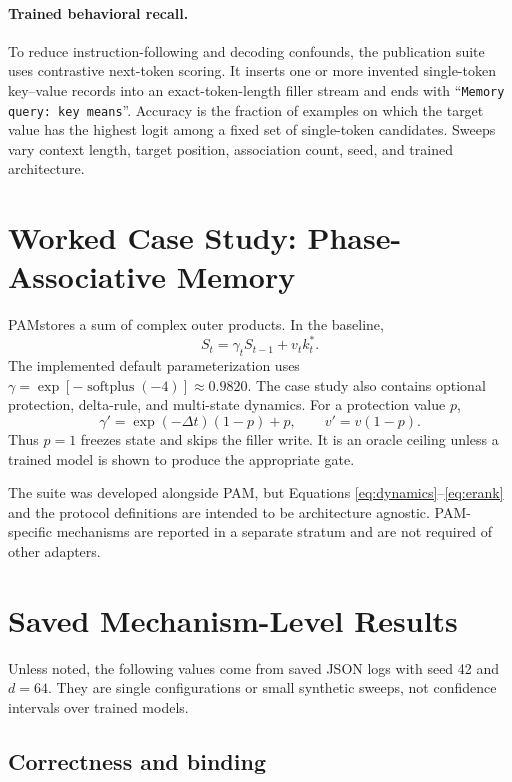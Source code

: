 \documentclass[10pt,twocolumn]{article}
\newcommand{\pam}{\textsc{PAM}}
\begin{document}
\paragraph{Trained behavioral recall.}
To reduce instruction-following and decoding confounds, the publication suite
uses contrastive next-token scoring.  It inserts one or more invented
single-token key--value records into an exact-token-length filler stream and
ends with ``\texttt{Memory query: key means}''.  Accuracy is the fraction of
examples on which the target value has the highest logit among a fixed set of
single-token candidates.  Sweeps vary context length, target position,
association count, seed, and trained architecture.

\section{Worked Case Study: Phase-Associative Memory}
\label{sec:pam}

\pam stores a sum of complex outer products.  In the baseline,
\begin{equation}
  S_t=\gamma_t S_{t-1}+v_tk_t^{*}.
\end{equation}
The implemented default parameterization uses
$\gamma=\exp[-\operatorname{softplus}(-4)]\approx0.9820$.  The case study also
contains optional protection, delta-rule, and multi-state dynamics.  For a
protection value $p$,
\begin{equation}
  \gamma'=\exp(-\Delta t)(1-p)+p,\qquad v'=v(1-p).
\end{equation}
Thus $p=1$ freezes state and skips the filler write.  It is an oracle ceiling
unless a trained model is shown to produce the appropriate gate.

The suite was developed alongside \pam, but Equations
\ref{eq:dynamics}--\ref{eq:erank} and the protocol definitions are intended to
be architecture agnostic.  \pam-specific mechanisms are reported in a
separate stratum and are not required of other adapters.

\section{Saved Mechanism-Level Results}
\label{sec:results}

Unless noted, the following values come from saved JSON logs with seed 42 and
$d=64$.  They are single configurations or small synthetic sweeps, not
confidence intervals over trained models.

\subsection{Correctness and binding}
\end{document}
